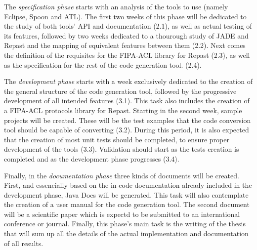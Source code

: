 The \emph{specification phase} starts with an analysis of the tools to use (namely Eclipse, Spoon and ATL). The first two weeks of this phase will be dedicated to the study of both tools' API and documentation (2.1), as well as actual testing of its features, followed by two weeks dedicated to a thourough study of JADE and Repast and the mapping of equivalent features between them (2.2). Next comes the definition of the requisites for the FIPA-ACL library for Repast (2.3), as well as the specification for the rest of the code generation tool. (2.4).

The \emph{development phase} starts with a week exclusively dedicated to the creation of the general structure of the code generation tool, followed by the progressive development of all intended features (3.1). This task also includes the creation of a FIPA-ACL protocols library for Repast. Starting in the second week, sample projects will be created. These will be the test examples that the code conversion tool should be capable of converting (3.2). During this period, it is also expected that the creation of most unit tests should be completed, to ensure proper development of the tools (3.3). Validation should start as the tests creation is completed and as the development phase progresses (3.4).

Finally, in the \emph{documentation phase} three kinds of documents will be created. First, and essencially based on the in-code documentation already included in the development phase, Java Docs will be generated. This task will also contemplate the creation of a user manual for the code generation tool. The second document will be a scientific paper which is expectd to be submitted to an international conference or journal. Finally, this phase's main task is the writing of the thesis that will sum up all the details of the actual implementation and documentation of all results.